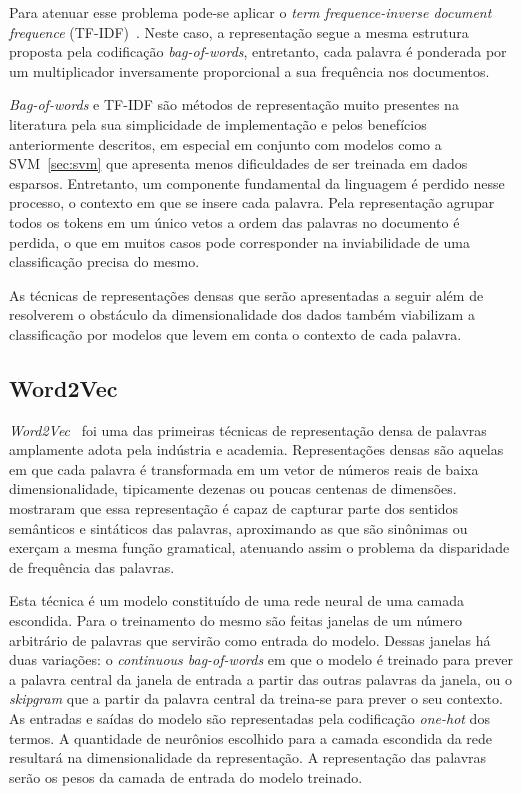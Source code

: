 Para atenuar esse problema pode-se aplicar o \textit{term frequence-inverse
document frequence} (TF-IDF)~\cite{salton88}.
Neste caso, a representação segue a mesma estrutura proposta pela codificação
\textit{bag-of-words}, entretanto, cada palavra é ponderada por um multiplicador
inversamente proporcional a sua frequência nos documentos.


\textit{Bag-of-words} e TF-IDF são métodos de representação muito presentes na
literatura pela sua simplicidade de implementação e pelos benefícios
anteriormente descritos, em especial em conjunto com modelos como a
SVM~\ref{sec:svm} que apresenta menos dificuldades de ser treinada em dados
esparsos.
Entretanto, um componente fundamental da linguagem é perdido nesse processo, o
contexto em que se insere cada palavra.
Pela representação agrupar todos os tokens em um único vetos a ordem das
palavras no documento é perdida, o que em muitos casos pode corresponder na
inviabilidade de uma classificação precisa do mesmo.


As técnicas de representações densas que serão apresentadas a seguir além de
resolverem o obstáculo da dimensionalidade dos dados também viabilizam a
classificação por modelos que levem em conta o contexto de cada palavra.

\subsection{Word2Vec} \label{sec:w2v}

\textit{Word2Vec}~\cite{mikolov13} foi uma das primeiras técnicas de
representação densa de palavras amplamente adota pela indústria e academia.
Representações densas são aquelas em que cada palavra é transformada em um vetor
de números reais de baixa dimensionalidade, tipicamente dezenas ou poucas
centenas de dimensões.
\citet{mikolov13} mostraram que essa representação é capaz de capturar parte dos
sentidos semânticos e sintáticos das palavras, aproximando as que são sinônimas
ou exerçam a mesma função gramatical, atenuando assim o problema da disparidade
de frequência das palavras.

Esta técnica é um modelo constituído de uma rede neural de uma camada escondida.
Para o treinamento do mesmo são feitas janelas de um número arbitrário de
palavras que servirão como entrada do modelo.
Dessas janelas há duas variações: o \textit{continuous bag-of-words} em que
o modelo é treinado para prever a palavra central da janela de entrada a partir
das outras palavras da janela, ou o \textit{skipgram} que a partir da palavra
central da treina-se para prever o seu contexto.
As entradas e saídas do modelo são representadas pela codificação
\textit{one-hot} dos termos.
A quantidade de neurônios escolhido para a camada escondida da rede resultará na
dimensionalidade da representação.
A representação das palavras serão os pesos da camada de entrada do modelo
treinado.

